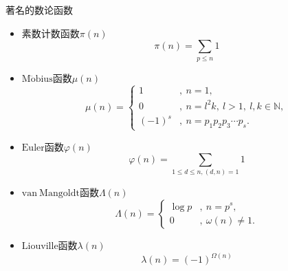 \begin{example}{著名的数论函数}
\begin{itemize}
\item 素数计数函数$\pi(n)$
\begin{equation}
\pi(n)=\sum_{p\leq n} 1
\end{equation}
\item $\mathrm{M\ddot{o}bius}$函数$\mu(n)$
\begin{equation}
\mu(n)=
\begin{cases}
1&,\ n=1,\\
0&,\ n=l^2k,\ l>1,\ l,k\in\mathbb{N},\\
(-1)^s&,\ n=p_1p_2p_3\cdots p_s.
\end{cases}
\end{equation}
\item $\mathrm{Euler}$函数$\varphi(n)$
\begin{equation}
\varphi(n)=\sum_{1\leq d\leq n,(d,n)=1}1
\end{equation}
\item $\mathrm{van\ Mangoldt}$函数$\Lambda(n)$
\begin{equation}
\varLambda(n)=
\begin{cases}
\log p&,\ n=p^s,\\
0&,\ \omega(n)\neq 1.
\end{cases}
\end{equation}
\item $\mathrm{Liouville}$函数$\lambda(n)$
\begin{equation}
\lambda(n)=(-1)^{\Omega(n)}
\end{equation}
\end{itemize}

\end{example}